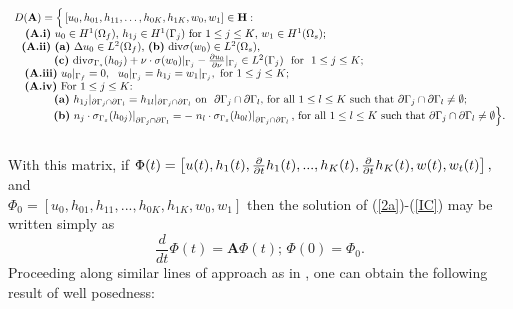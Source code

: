\documentclass[11pt]{article}
\begin{document}
\begin{equation}
\begin{array}{l}
D(\mathbf{A})=\Big\{ \left[ u_{0},h_{01},h_{11},\ldots
,h_{0K},h_{1K},w_{0},w_{1}\right] \in \mathbf{H}:  \\ 
\text{ \ \ \textbf{(A.i)} }u_{0}\in H^{1}(\Omega _{f})\text{, }h_{1j}\in
H^{1}(\Gamma _{j})\text{ for }1\leq j\leq K\text{, }w_{1}\in H^{1}(\Omega
_{s})\text{;} \\ 
\text{ \ } \text{\textbf{(A.ii)} \textbf{(a)} }\Delta u_{0}\in L^{2}(\Omega
_{f})\text{, \textbf{(b)} div}\sigma (w_{0})\in L^{2}(\Omega _{s}), \\
\text{\ \ \ \ \ \ \ \ \ \ \  \textbf{(c)} div}%
\sigma _{\Gamma _{s}}(h_{0j})+\nu \cdot \sigma (w_{0})|_{\Gamma _{j}}-\frac{%
\partial u_{0}}{\partial \nu }|_{\Gamma _{j}}\in L^{2}(\Gamma _{j})\text{ \
for \ }1\leq j\leq K\text{;} \\ 
\text{ \ }\left. \text{\textbf{(A.iii)} }u_{0}|_{\Gamma _{f}}=0,\ \
u_{0}|_{\Gamma _{j}}=h_{1j}=w_{1}|_{\Gamma _{j}},\ \text{for }1\leq j\leq K%
\text{;}\right.  \\ 
\text{ \ }\left. \text{\textbf{(A.iv)} For }1\leq j\leq K\text{: }\right. 
\\ 
\text{ \ \ \ \ \ \ \ \ \ \ \textbf{(a)} }h_{1j}|_{\partial \Gamma _{j}\cap \partial \Gamma
_{l}}=h_{1l}|_{\partial \Gamma _{j}\cap \partial \Gamma _{l}}\text{ on \ }%
\partial \Gamma _{j}\cap \partial \Gamma _{l}\text{, for all }1\leq l\leq K%
\text{ such that }\partial \Gamma _{j}\cap \partial \Gamma _{l}\neq
\emptyset ; \\ 
\text{ \ \ \ \ \ \ \ \ \  }\left. \text{\textbf{(b)} } n_{j}\cdot \sigma _{\Gamma
_{s}}(h_{0j})\right\vert _{\partial \Gamma _{j}\cap \partial \Gamma
_{l}}=-\left. n_{l}\cdot \sigma _{\Gamma _{s}}(h_{0l})\right\vert _{\partial
\Gamma _{j}\cap \partial \Gamma _{l}}\text{, for all }1\leq l\leq K\text{
such that }\partial \Gamma _{j}\cap \partial \Gamma _{l}\neq \emptyset
\Big\} .%
\end{array}
\label{dom}
\end{equation}%
\\

\noindent With this matrix, if $\Phi (t)=\left[ u(t),h_{1}(t),\frac{\partial }{%
\partial t}h_{1}(t),...,h_{K}(t),\frac{\partial }{\partial t}%
h_{K}(t),w(t),w_{t}(t)\right] ,$ and\\  $\Phi
_{0}=[u_{0},h_{01},h_{11},...,h_{0K},h_{1K},w_{0},w_{1}]$ then the solution
of (\ref{2a})-(\ref{IC}) may be written simply as%
\begin{equation}
\frac{d}{dt}\Phi (t)=\mathbf{A}\Phi (t)\text{; \ }\Phi (0)=\Phi _{0}.
\label{ODE}
\end{equation}
Proceeding along similar lines of approach as in \cite{jde}, one can obtain the
following result of well posedness:
\end{document}
